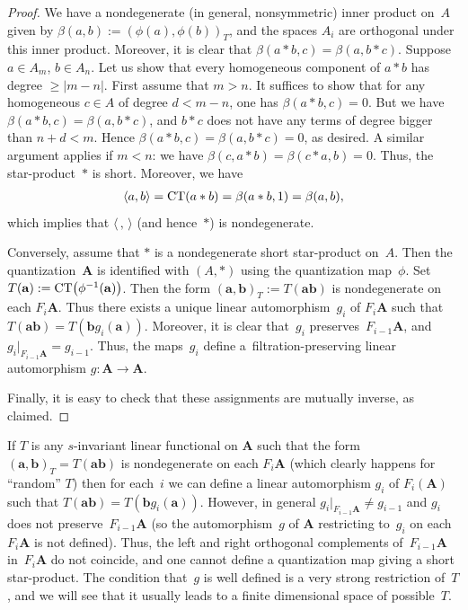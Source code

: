 \begin{proof} We have a nondegenerate (in general, nonsymmetric) inner product on~$A$ given by $\beta(a,b):=(\phi(a),\phi(b))_T$, and the spaces $A_i$ are orthogonal under this inner product. Moreover, it is clear that $\beta(a*b,c)=\beta(a,b*c)$. Suppose $a\in A_m$, $b\in A_n$. Let us show that every homogeneous component of $a*b$ has degree $\ge |m-n|$. First assume that $m>n$. It suffices to show that for any homogeneous $c\in A$ of degree $d<m-n$, one has $\beta(a*b,c)=0$. But we have $\beta(a*b,c)=\beta(a,b*c)$, and $b*c$ does not have any terms of degree bigger than $n+d<m$.
Hence $\beta(a*b,c)=\beta(a,b*c)=0$, as desired. A similar argument applies if $m<n$: we have $\beta(c,a*b)=\beta(c*a,b)=0$. Thus, the star-product~$*$ is short. Moreover, we have
\begin{gather*}
\langle a,b\rangle={\rm CT}(a*b)=\beta(a*b,1)=\beta(a,b),
\end{gather*}
which implies that $\langle\,,\,\rangle$ (and hence~$*$) is nondegenerate.

Conversely, assume that $*$ is a nondegenerate short star-product on~$A$. Then the quantization~${{\mathbf A}}$ is identified with $(A,*)$ using the quantization map~$\phi$. Set $T({\mathbf a}):={\rm CT}\big(\phi^{-1}({\mathbf a})\big)$. Then the form $({\textbf{a}},{\textbf{b}})_T:=T({\textbf{ab}})$ is nondegenerate on each $F_i{{\mathbf A}}$. Thus there exists a unique linear automorphism~$g_i$ of $F_i{{\mathbf A}}$ such that $T({\textbf{ab}})=T({\mathbf b}g_i({\mathbf a}))$. Moreover, it is clear that~$g_i$ preserves~$F_{i-1}{{\mathbf A}}$, and $g_i|_{F_{i-1}{{\mathbf A}}}=g_{i-1}$. Thus, the maps~$g_i$ define a~filtration-preserving linear automorphism $g\colon {{\mathbf A}}\to {{\mathbf A}}$.

Finally, it is easy to check that these assignments are mutually inverse, as claimed.
\end{proof}

\begin{Remark} If $T$ is any $s$-invariant linear functional on ${\mathbf A}$ such that the form $({\mathbf a},{\mathbf b})_T=T({\mathbf a}{\mathbf b})$ is nondegenerate on each $F_i{\mathbf A}$ (which clearly happens for ``random'' $T$) then for each~$i$ we can define a linear automorphism $g_i$ of $F_i({\mathbf A})$ such that $T({\textbf{ab}})=T({\mathbf b}g_i({\mathbf a}))$. However, in general $g_i|_{F_{i-1}{\mathbf A}}\ne g_{i-1}$ and $g_i$ does not preserve~$F_{i-1}{\mathbf A}$ (so the automorphism~$g$ of ${\mathbf A}$ restricting to~$g_i$ on each $F_i{\mathbf A}$ is not defined). Thus, the left and right orthogonal complements of~$F_{i-1}{\mathbf A}$ in~$F_i{\mathbf A}$ do not coincide, and one cannot define a quantization map giving a short star-product. The condition that~$g$ is well defined is a very strong restriction of~$T$, and we will see that it usually leads to a finite dimensional space of possible~$T$.
\end{Remark}

